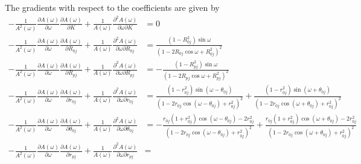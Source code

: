 \documentclass[a4paper,twoside,10pt,english]{report}
\begin{document}
The gradients with respect to the coefficients are given by
\begin{align*}
-\frac{1}{A^{2}\left(\omega\right)}
\frac{\partial A\left(\omega\right)}{\partial\omega} 
\frac{\partial A\left(\omega\right)}{\partial K}+
\frac{1}{A\left(\omega\right)}
\frac{\partial^{2} A\left(\omega\right)}{\partial\omega\partial K} &= 0 \\
-\frac{1}{A^{2}\left(\omega\right)}
\frac{\partial A\left(\omega\right)}{\partial\omega} 
\frac{\partial A\left(\omega\right)}{\partial R_{0j}}+
\frac{1}{A\left(\omega\right)}
\frac{\partial^{2} A\left(\omega\right)}{\partial\omega\partial R_{0j}} &=
\frac{\left(1-R_{0j}^2\right)\sin\omega}
{\left(1-2R_{0j}\cos\omega+R_{0j}^{2}\right)^2} \\
-\frac{1}{A^{2}\left(\omega\right)}
\frac{\partial A\left(\omega\right)}{\partial\omega} 
\frac{\partial A\left(\omega\right)}{\partial R_{pj}}+
\frac{1}{A\left(\omega\right)}
\frac{\partial^{2} A\left(\omega\right)}{\partial\omega\partial R_{pj}} &=
-\frac{\left(1-R_{pj}^2\right)\sin\omega}
{\left(1-2R_{pj}\cos\omega+R_{pj}^{2}\right)^2} \\
-\frac{1}{A^{2}\left(\omega\right)}
\frac{\partial A\left(\omega\right)}{\partial\omega} 
\frac{\partial A\left(\omega\right)}{\partial r_{0j}}+
\frac{1}{A\left(\omega\right)}
\frac{\partial^{2} A\left(\omega\right)}{\partial\omega\partial r_{0j}} &=
\frac{\left(1-r_{0j}^2\right)\sin\left(\omega-\theta_{0j}\right)}
{\left(1-2r_{0j}\cos\left(\omega-\theta_{0j}\right)+r_{0j}^{2}\right)^2} 
+\frac{\left(1-r_{0j}^2\right)\sin\left(\omega+\theta_{0j}\right)}
{\left(1-2r_{0j}\cos\left(\omega+\theta_{0j}\right)+r_{0j}^{2}\right)^2} \\
-\frac{1}{A^{2}\left(\omega\right)}
\frac{\partial A\left(\omega\right)}{\partial\omega} 
\frac{\partial A\left(\omega\right)}{\partial \theta_{0j}}+
\frac{1}{A\left(\omega\right)}
\frac{\partial^{2} A\left(\omega\right)}{\partial\omega\partial \theta_{0j}} &=
-\frac{r_{0j}\left(1+r_{0j}^2\right)\cos\left(\omega-\theta_{0j}\right)-2r_{0j}^{2}}
{\left(1-2r_{0j}\cos\left(\omega-\theta_{0j}\right)+r_{0j}^{2}\right)^2} 
+\frac{r_{0j}\left(1+r_{0j}^2\right)\cos\left(\omega+\theta_{0j}\right)-2r_{0j}^{2}}
{\left(1-2r_{0j}\cos\left(\omega+\theta_{0j}\right)+r_{0j}^{2}\right)^2} \\
-\frac{1}{A^{2}\left(\omega\right)}
\frac{\partial A\left(\omega\right)}{\partial\omega} 
\frac{\partial A\left(\omega\right)}{\partial r_{pj}}+
\frac{1}{A\left(\omega\right)}
\frac{\partial^{2} A\left(\omega\right)}{\partial\omega\partial r_{pj}} &=

\end{align*}
\end{document}

